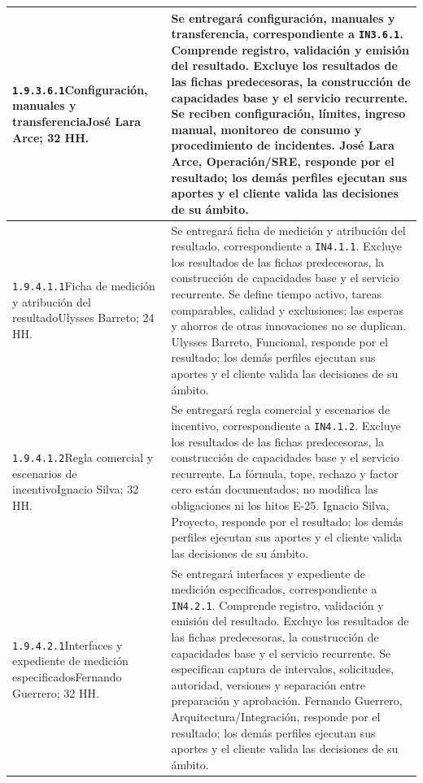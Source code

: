 \begin{longtable}{L{52mm}L{91mm}}
\texttt{1.\allowbreak{}9.\allowbreak{}3.\allowbreak{}6.\allowbreak{}1}\newline Configuración, manuales y transferencia\newline José Lara Arce; 32 HH. & Se entregará configuración, manuales y transferencia, correspondiente a \texttt{IN3.6.1}. Comprende registro, validación y emisión del resultado. Excluye los resultados de las fichas predecesoras, la construcción de capacidades base y el servicio recurrente.  Se reciben configuración, límites, ingreso manual, monitoreo de consumo y procedimiento de incidentes. José Lara Arce, Operación/SRE, responde por el resultado; los demás perfiles ejecutan sus aportes y el cliente valida las decisiones de su ámbito.\\\hline
\texttt{1.\allowbreak{}9.\allowbreak{}4.\allowbreak{}1.\allowbreak{}1}\newline Ficha de medición y atribución del resultado\newline Ulysses Barreto; 24 HH. & Se entregará ficha de medición y atribución del resultado, correspondiente a \texttt{IN4.1.1}. Excluye los resultados de las fichas predecesoras, la construcción de capacidades base y el servicio recurrente.  Se define tiempo activo, tareas comparables, calidad y exclusiones; las esperas y ahorros de otras innovaciones no se duplican. Ulysses Barreto, Funcional, responde por el resultado; los demás perfiles ejecutan sus aportes y el cliente valida las decisiones de su ámbito.\\\hline
\texttt{1.\allowbreak{}9.\allowbreak{}4.\allowbreak{}1.\allowbreak{}2}\newline Regla comercial y escenarios de incentivo\newline Ignacio Silva; 32 HH. & Se entregará regla comercial y escenarios de incentivo, correspondiente a \texttt{IN4.1.2}. Excluye los resultados de las fichas predecesoras, la construcción de capacidades base y el servicio recurrente.  La fórmula, tope, rechazo y factor cero están documentados; no modifica las obligaciones ni los hitos E-25. Ignacio Silva, Proyecto, responde por el resultado; los demás perfiles ejecutan sus aportes y el cliente valida las decisiones de su ámbito.\\\hline
\texttt{1.\allowbreak{}9.\allowbreak{}4.\allowbreak{}2.\allowbreak{}1}\newline Interfaces y expediente de medición especificados\newline Fernando Guerrero; 32 HH. & Se entregará interfaces y expediente de medición especificados, correspondiente a \texttt{IN4.2.1}. Comprende registro, validación y emisión del resultado. Excluye los resultados de las fichas predecesoras, la construcción de capacidades base y el servicio recurrente.  Se especifican captura de intervalos, solicitudes, autoridad, versiones y separación entre preparación y aprobación. Fernando Guerrero, Arquitectura/Integración, responde por el resultado; los demás perfiles ejecutan sus aportes y el cliente valida las decisiones de su ámbito.\\\hline

\end{longtable}
